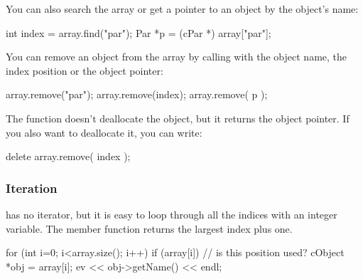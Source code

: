 You can also search the array or get a pointer to an object by
the object's name:

\begin{cpp}
int index = array.find("par");
Par *p = (cPar *) array["par"];
\end{cpp}


You can remove an object from the array by calling 
with the object name, the index position or the object pointer:

\begin{cpp}
array.remove("par");
array.remove(index);
array.remove( p );
\end{cpp}


The  function doesn't deallocate the object, but it
returns the object pointer. If you also want to deallocate it, you can
write:

\begin{cpp}
delete array.remove( index );
\end{cpp}

\subsubsection{Iteration}


 has no iterator, but it is easy to loop through all the
indices with an integer variable. The  member function
returns the largest index plus one.

\begin{cpp}
for (int i=0; i<array.size(); i++)
{
    if (array[i]) // is this position used?
    {
        cObject *obj = array[i];
        ev << obj->getName() << endl;
    }
}
\end{cpp}


%
%
%
%




